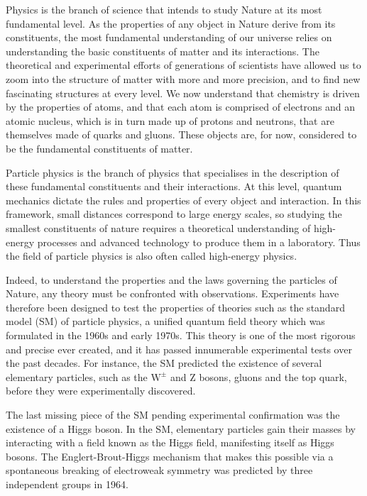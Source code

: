 Physics is the branch of science that intends to study Nature at its most fundamental level. As the properties of any object in Nature derive from its constituents, the most fundamental understanding of our universe relies on understanding the basic constituents of matter and its interactions. The theoretical and experimental efforts of generations of scientists have allowed us to zoom into the structure of matter with more and more precision, and to find new fascinating structures at every level. We now understand that chemistry is driven by the properties of atoms, and that each atom is comprised of electrons and an atomic nucleus, which is in turn made up of protons and neutrons, that are themselves made of quarks and gluons. These objects are, for now, considered to be the fundamental constituents of matter.

Particle physics is the branch of physics that specialises in the description of these fundamental constituents and their interactions. At this level, quantum mechanics dictate the rules and properties of every object and interaction. In this framework, small distances correspond to large energy scales, so studying the smallest constituents of nature requires a theoretical understanding of high-energy processes and advanced technology to produce them in a laboratory. Thus the field of particle physics is also often called high-energy physics.

Indeed, to understand the properties and the laws governing the particles of Nature, any theory must be confronted with observations. Experiments have therefore been designed to test the properties of theories such as the standard model (SM) of particle physics, a unified quantum field theory which was formulated in the 1960s and early 1970s. This theory is one of the most rigorous and precise ever created, and it has passed innumerable experimental tests over the past decades. For instance, the SM predicted the existence of several elementary particles, such as the $\mathrm{W^{\pm}}$ and $\mathrm{Z}$ bosons, gluons and the top quark, before they were experimentally discovered.

The last missing piece of the SM pending experimental confirmation was the existence of a Higgs boson. In the SM, elementary particles gain their masses by interacting with a field known as the Higgs field, manifesting itself as Higgs bosons. The Englert-Brout-Higgs mechanism that makes this possible via a spontaneous breaking of electroweak symmetry was predicted by three independent groups in 1964.

